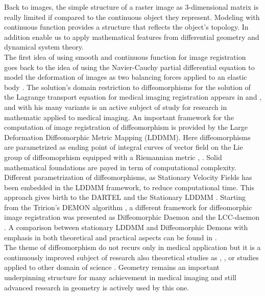 Back to images, the simple structure of a raster image as 3-dimensional matrix is really limited if compared to the continuous object they represent. Modeling with continuous function provides a structure that reflects the object's topology. In addition enable us to apply mathematical features from differential geometry and dynamical system theory.\\
The first idea of using smooth and continuous function for image registration goes back to the idea of using the Navier-Cauchy partial differential equation to model the deformation of images as two balancing forces applied to an elastic body \cite{Broit:1981}. The solution's domain restriction to diffeomorphisms for the solution of the Lagrange transport equation for medical imaging registration appears in \cite{Dupuis:98:variationalproblems} and \cite{Trouve:98}, and with his many variants is an active subject of study for research in mathematic applied to medical imaging.
An important framework for the computation of image registration of diffeomorphism is provided by the Large Deformation Diffeomorphic Metric Mapping (LDDMM). Here diffeomorphisms are parametrized as ending point of integral curves of vector field on the Lie group of diffeomoprhism equipped with a Riemannian metric \cite{dupuis1998variational}, \cite{beg2005computing}. Solid mathematical foundations are payed in term of computational complexity. Different parametrization of diffeomorphisms, as Stationary Velocity Fields \cite{arsigny2006statistics} has been embedded in the LDDMM framework, to reduce computational time. This approach gives birth to the DARTEL \cite{Ashburner:07} and the Stationary LDDMM \cite{hernandez2007registration}. Starting from the Tririon's DEMON algorithm \cite{thirion1998image}, a different framework for diffeomorphic image registration was presented as Diffeomorphic Daemon \cite{vercauteren2007non} and the LCC-daemon \cite{lorenzi2013lcc} . A comparison between stationary LDDMM and Diffeomorphic Demons with emphasis in both theoretical and practical aspects can be found in \cite{hernandez2008comparing}. \\
The theme of diffeomorphism do not recurs only in medical application but it is a continuously improved subject of research also theoretical studies as \cite{Milnor:84:remarks}, \cite{bauer2011geodesic}, \cite{bauer2010sobolev} or studies applied to other domain of science \cite{Arnold:Khesin:14} \cite{ovsienko1992integrals}. Geometry remains an important underpinning structure for many achievement in medical imaging and still advanced research in geometry is actively used by this one.\\
